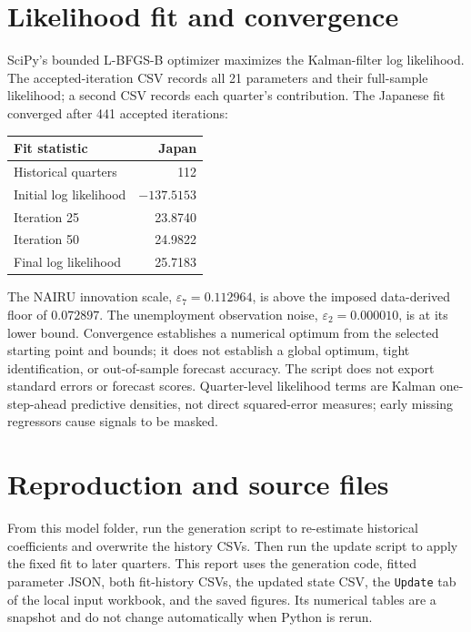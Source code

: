 \documentclass[11pt,a4paper]{article}
\newcommand{\eps}{\varepsilon}
\begin{document}
\section{Likelihood fit and convergence}
SciPy's bounded L-BFGS-B optimizer maximizes the Kalman-filter log
likelihood. The accepted-iteration CSV records all 21 parameters and their
full-sample likelihood; a second CSV records each quarter's contribution.
The Japanese fit converged after 441 accepted iterations:
\begin{center}
\begin{tabular}{@{}lr@{}}
\toprule
Fit statistic & Japan\\
\midrule
Historical quarters & 112\\
Initial log likelihood & $-137.5153$\\
Iteration 25 & 23.8740\\
Iteration 50 & 24.9822\\
Final log likelihood & 25.7183\\
\bottomrule
\end{tabular}
\end{center}
The NAIRU innovation scale, $\eps_7=0.112964$, is above the imposed
data-derived floor of $0.072897$. The unemployment observation noise,
$\eps_2=0.000010$, is at its lower bound. Convergence establishes a numerical
optimum from the selected starting point and bounds; it does not establish
a global optimum, tight identification, or out-of-sample forecast accuracy.
The script does not export standard errors or forecast scores. Quarter-level
likelihood terms are Kalman one-step-ahead predictive densities, not direct
squared-error measures; early missing regressors cause signals to be masked.

\section{Reproduction and source files}
From this model folder, run the generation script to re-estimate historical
coefficients and overwrite the history CSVs. Then run the update script to
apply the fixed fit to later quarters. This report uses the generation code,
fitted parameter JSON, both fit-history CSVs, the updated state CSV, the
\texttt{Update} tab of the local input workbook, and the saved figures.
Its numerical tables are a snapshot and do not change automatically when
Python is rerun.
\end{document}
